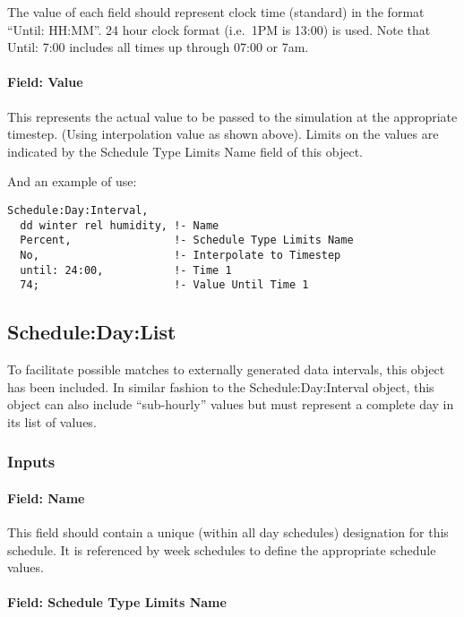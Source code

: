 The value of each field should represent clock time (standard) in the format ``Until: HH:MM''. 24 hour clock format (i.e.~1PM is 13:00) is used. Note that Until: 7:00 includes all times up through 07:00 or 7am.

\paragraph{Field: Value}\label{field-value}

This represents the actual value to be passed to the simulation at the appropriate timestep. (Using interpolation value as shown above). Limits on the values are indicated by the Schedule Type Limits Name field of this object.

And an example of use:

\begin{lstlisting}
Schedule:Day:Interval,
  dd winter rel humidity, !- Name
  Percent,                !- Schedule Type Limits Name
  No,                     !- Interpolate to Timestep
  until: 24:00,           !- Time 1
  74;                     !- Value Until Time 1
\end{lstlisting}

\subsection{Schedule:Day:List}\label{scheduledaylist}

To facilitate possible matches to externally generated data intervals, this object has been included. In similar fashion to the Schedule:Day:Interval object, this object can also include ``sub-hourly'' values but must represent a complete day in its list of values.

\subsubsection{Inputs}\label{inputs-3-032}

\paragraph{Field: Name}\label{field-name-3-028}

This field should contain a unique (within all day schedules) designation for this schedule. It is referenced by week schedules to define the appropriate schedule values.

\paragraph{Field: Schedule Type Limits Name}\label{field-schedule-type-limits-name-2-000}

